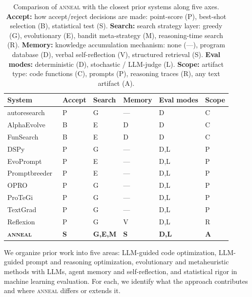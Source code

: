 \begin{table}[t]
  \centering
  \caption{Comparison of \textsc{anneal} with the closest prior systems along
  five axes. \textbf{Accept:} how accept/reject decisions are made: point-score
  (P), best-shot selection (B), statistical test (S). \textbf{Search:} search
  strategy layer: greedy (G), evolutionary (E), bandit meta-strategy (M),
  reasoning-time search (R). \textbf{Memory:} knowledge accumulation
  mechanism: none (---), program database (D), verbal self-reflection (V),
  structured retrieval (S). \textbf{Eval modes:} deterministic (D),
  stochastic / LLM-judge (L). \textbf{Scope:} artifact type: code functions
  (C), prompts (P), reasoning traces (R), any text artifact (A).}
  \label{tab:related-comparison}
  \small
  \begin{tabular}{@{}llllll@{}}
    \toprule
    System & Accept & Search & Memory & Eval modes & Scope \\
    \midrule
    autoresearch~\cite{karpathy2025autoresearch} & P & G & --- & D & C \\
    AlphaEvolve~\cite{novikov2025alphaevolve} & B & E & D & D     & C \\
    FunSearch~\cite{romera2024funsearch}      & B & E & D & D     & C \\
    DSPy~\cite{khattab2024dspy}               & P & G & --- & D,L   & P \\
    EvoPrompt~\cite{guo2023evoprompt}         & P & E & --- & D,L   & P \\
    Promptbreeder~\cite{fernando2024promptbreeder} & P & E & --- & D,L & P \\
    OPRO~\cite{yang2024opro}                  & P & G & --- & D,L   & P \\
    ProTeGi~\cite{pryzant2023protegi}         & P & G & --- & D,L   & P \\
    TextGrad~\cite{yuksekgonul2024textgrad}   & P & G & --- & D,L   & P \\
    Reflexion~\cite{shinn2023reflexion}       & P & G & V   & D,L   & R \\
    \midrule
    \textbf{\textsc{anneal}}                  & \textbf{S} & \textbf{G,E,M} & \textbf{S} & \textbf{D,L} & \textbf{A} \\
    \bottomrule
  \end{tabular}
\end{table}

We organize prior work into five areas: LLM-guided code optimization, LLM-guided prompt and reasoning optimization, evolutionary and metaheuristic methods with LLMs, agent memory and self-reflection, and statistical rigor in machine learning evaluation.
For each, we identify what the approach contributes and where \textsc{anneal} differs or extends it.

